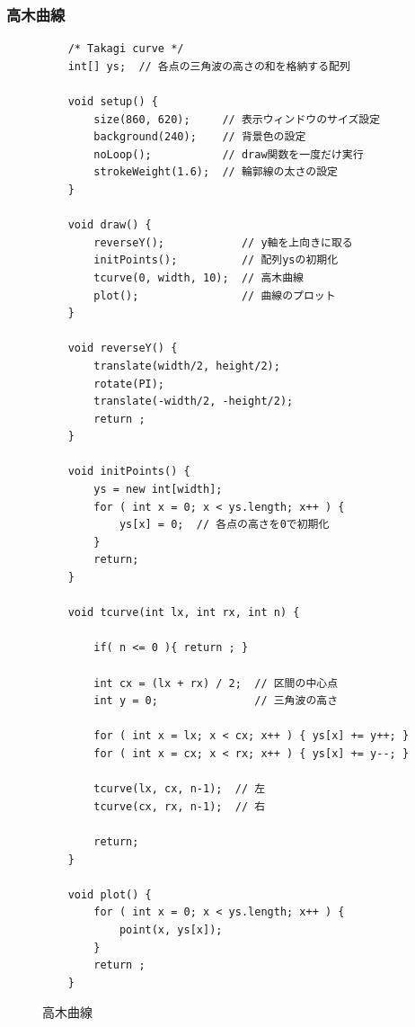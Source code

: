 \documentclass[dvipdfmx]{jsarticle}
\theoremstyle{definition}
\begin{document}
\subsubsection{高木曲線}
\label{code_takagi_curve_all}
\begin{figure}[ht]
\begin{center}
\begin{oframed}
\footnotesize
\begin{verbatim}
    /* Takagi curve */
    int[] ys;  // 各点の三角波の高さの和を格納する配列

    void setup() {
        size(860, 620);     // 表示ウィンドウのサイズ設定
        background(240);    // 背景色の設定
        noLoop();           // draw関数を一度だけ実行
        strokeWeight(1.6);  // 輪郭線の太さの設定
    }

    void draw() {
        reverseY();            // y軸を上向きに取る
        initPoints();          // 配列ysの初期化
        tcurve(0, width, 10);  // 高木曲線
        plot();                // 曲線のプロット
    }

    void reverseY() {
        translate(width/2, height/2);
        rotate(PI);
        translate(-width/2, -height/2);
        return ;
    }

    void initPoints() {
        ys = new int[width];
        for ( int x = 0; x < ys.length; x++ ) {
            ys[x] = 0;  // 各点の高さを0で初期化
        }
        return;
    }

    void tcurve(int lx, int rx, int n) {

        if( n <= 0 ){ return ; }

        int cx = (lx + rx) / 2;  // 区間の中心点
        int y = 0;               // 三角波の高さ

        for ( int x = lx; x < cx; x++ ) { ys[x] += y++; }
        for ( int x = cx; x < rx; x++ ) { ys[x] += y--; }

        tcurve(lx, cx, n-1);  // 左
        tcurve(cx, rx, n-1);  // 右

        return;
    }

    void plot() {
        for ( int x = 0; x < ys.length; x++ ) {
            point(x, ys[x]);
        }
        return ;
    }
\end{verbatim}
\end{oframed}
\end{center}
\caption{高木曲線}
\end{figure}


\newpage{}
\end{document}
